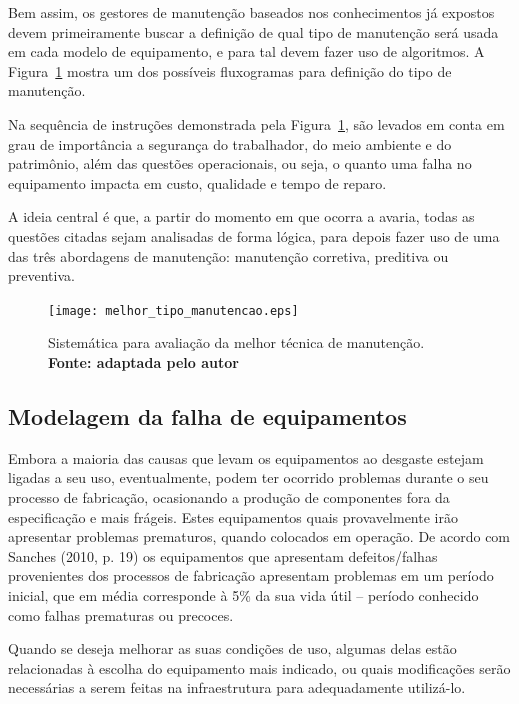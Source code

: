 Bem assim, os gestores de manutenção baseados nos conhecimentos já expostos devem primeiramente buscar a definição de qual tipo de manutenção será usada em cada modelo de equipamento, e para tal devem fazer uso de algoritmos. A Figura~\ref{melhor_tecnica_de_manutencao} mostra um dos possíveis fluxogramas para definição do tipo de manutenção.

Na sequência de instruções demonstrada pela Figura~\ref{melhor_tecnica_de_manutencao}, são levados em conta em grau de importância a segurança do trabalhador, do meio ambiente e do patrimônio, além das questões operacionais, ou seja, o quanto uma falha no equipamento impacta em custo, qualidade e tempo de reparo.

A ideia central é que, a partir do momento em que ocorra a avaria, todas as questões citadas sejam analisadas de forma lógica, para depois fazer uso de uma das três abordagens de manutenção: manutenção corretiva, preditiva ou preventiva.

\begin{landscape}
\graphicspath{{figuras/}}
\begin{figure}[H]
\centering
\texttt{[image: melhor\_tipo\_manutencao.eps]}
\caption{Sistemática para avaliação da melhor técnica de manutenção. \textbf{Fonte: \cite{neumann2013gestao} adaptada pelo autor}}
\label{melhor_tecnica_de_manutencao}
\end{figure}
\end{landscape}


\subsection{Modelagem da falha de equipamentos}

Embora a maioria das causas que levam os equipamentos ao desgaste estejam ligadas a seu uso, eventualmente, podem ter ocorrido problemas durante o seu processo de fabricação, ocasionando a produção de componentes fora da especificação e mais frágeis. Estes equipamentos quais provavelmente irão apresentar problemas prematuros, quando colocados em operação. De acordo com Sanches (2010, p. 19) os equipamentos que apresentam defeitos/falhas provenientes dos processos de fabricação apresentam problemas em um período inicial, que em média corresponde à 5\% da sua vida útil – período conhecido como falhas prematuras ou precoces.

Quando se deseja melhorar as suas condições de uso, algumas delas estão relacionadas à escolha do equipamento mais indicado, ou quais modificações serão necessárias a serem feitas na infraestrutura para adequadamente utilizá-lo.

